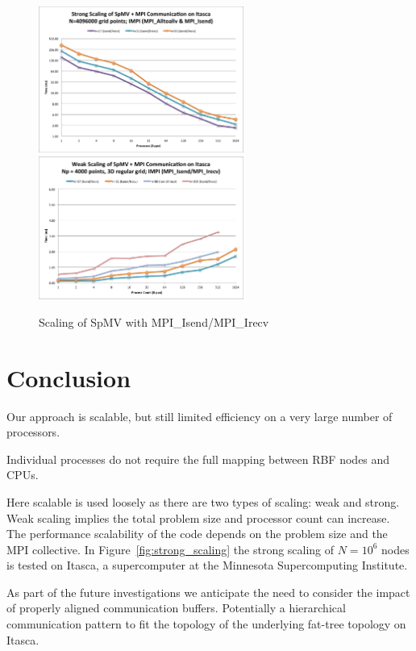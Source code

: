 \documentclass{report}
\begin{document}
\begin{figure}
\centering
\includegraphics[width=0.6\textwidth]{performance_content/scaling/strong_scaling_4M_regular_isend.png}  
\includegraphics[width=0.6\textwidth]{performance_content/scaling/weak_scaling_np4000_regular_isend.png}  
\caption{Scaling of SpMV with MPI\_Isend/MPI\_Irecv}
\end{figure}

\section{Conclusion}

      Our approach is scalable, but still limited efficiency on a very large number of 
		processors. 
		
Individual processes do not require the 
		full mapping between RBF nodes and CPUs. 
		
Here scalable is used loosely as there are two types of scaling: weak and strong. Weak scaling implies the total problem size and processor count can increase. The performance scalability of the code depends on the problem size and the MPI collective. In Figure~\ref{fig:strong_scaling} the strong scaling of $N=10^6$ nodes is tested on Itasca, a supercomputer at the Minnesota Supercomputing Institute.   


As part of the future investigations we anticipate the need to consider the impact of properly aligned communication buffers. Potentially a hierarchical communication pattern to fit the topology of the underlying fat-tree topology on Itasca. 
\end{document}
